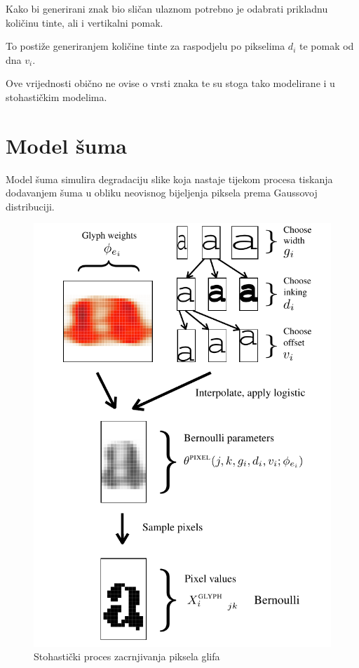 \documentclass[zavrsnirad]{fer}
\begin{document}
\setlength{\parskip}{0pt}
\begin{multicols}{2}	
	Kako bi generirani znak bio sličan ulaznom potrebno je odabrati prikladnu količinu tinte, ali i vertikalni pomak.
	
	To postiže generiranjem količine tinte za raspodjelu po pikselima $d_i$ te pomak od dna $v_i$.
	
	Ove vrijednosti obično ne ovise o vrsti znaka te su stoga tako modelirane i u stohastičkim modelima.
	
	\section{Model šuma}
	
	Model šuma simulira degradaciju slike koja nastaje tijekom procesa tiskanja dodavanjem šuma u obliku neovisnog bijeljenja piksela prema Gaussovoj distribuciji.
	
	\columnbreak
	\begin{figure}[H]
		\centering
		\vspace{10pt}
		\includegraphics[width=0.9\linewidth]{Figures/inking-model.png} 
		\caption{Stohastički proces zacrnjivanja piksela glifa \cite{Berg2013}}
		\label{fig:inking-model}
	\end{figure}
	
\end{multicols}
\end{document}

